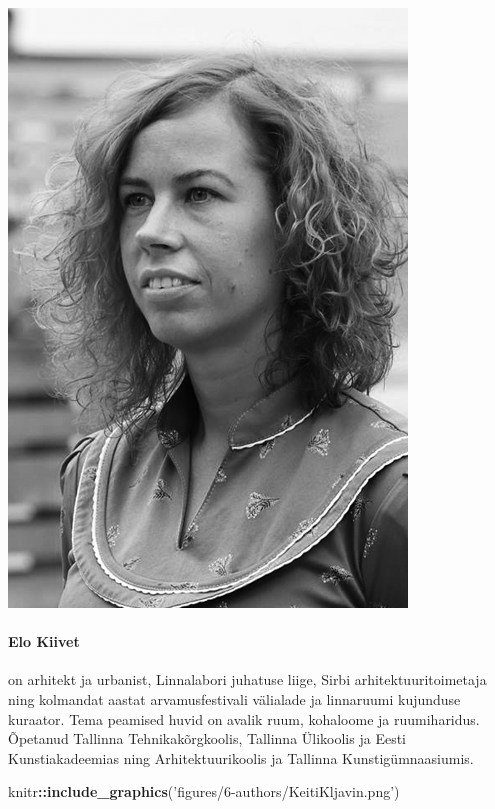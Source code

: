 \documentclass[estonian,]{article}
\newenvironment{Shaded}{\begin{snugshade}}{\end{snugshade}}
\newcommand{\KeywordTok}[1]{\textcolor[rgb]{0.13,0.29,0.53}{\textbf{#1}}}
\newcommand{\NormalTok}[1]{#1}
\newcommand{\OperatorTok}[1]{\textcolor[rgb]{0.81,0.36,0.00}{\textbf{#1}}}
\newcommand{\StringTok}[1]{\textcolor[rgb]{0.31,0.60,0.02}{#1}}
\let\oldparagraph\paragraph
\renewcommand{\paragraph}[1]{\oldparagraph{#1}\mbox{}}
\begin{document}
\begin{flushleft}\includegraphics[width=0.5\linewidth]{figures/6-authors/EloKiivet} \end{flushleft}

\hypertarget{elo-kiivet}{%
\paragraph{Elo Kiivet}\label{elo-kiivet}}

on arhitekt ja urbanist, Linnalabori juhatuse liige, Sirbi arhitektuuritoimetaja ning kolmandat aastat arvamusfestivali välialade ja linnaruumi kujunduse kuraator. Tema peamised huvid on avalik ruum, kohaloome ja ruumiharidus. Õpetanud Tallinna Tehnikakõrgkoolis, Tallinna Ülikoolis ja Eesti Kunstiakadeemias ning Arhitektuurikoolis ja Tallinna Kunstigümnaasiumis.

\begin{Shaded}
\begin{Highlighting}[]
\NormalTok{knitr}\OperatorTok{::}\KeywordTok{include_graphics}\NormalTok{(}\StringTok{'figures/6-authors/KeitiKljavin.png'}\NormalTok{)}
\end{Highlighting}
\end{Shaded}
\end{document}
